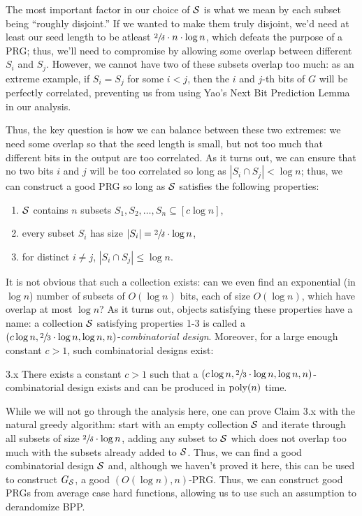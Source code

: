 \documentclass[11pt]{article}
\begin{document}
\noindent
The most important factor in our choice of $\mathcal{S}$ is what we mean by each subset being ``roughly disjoint.'' If we wanted to make them truly disjoint, we'd need at least our seed length to be atleast $\sfrac{2}{\delta} \cdot n \cdot \log n$, which defeats the purpose of a PRG; thus, we'll need to compromise by allowing some overlap between different $S_i$ and $S_j$. However, we cannot have two of these subsets overlap too much: as an extreme example, if $S_i = S_j$ for some $i < j$, then the $i$ and $j$-th bits of $G$ will be perfectly correlated, preventing us from using Yao's Next Bit Prediction Lemma in our analysis.

Thus, the key question is how we can balance between these two extremes: we need some overlap so that the seed length is small, but not too much that different bits in the output are too correlated. As it turns out, we can ensure that no two bits $i$ and $j$ will be too correlated so long as $|S_i \cap S_j| < \log n$; thus, we can construct a good PRG so long as $\mathcal{S}$ satisfies the following properties:
\begin{enumerate}
    \item $\mathcal{S}$ contains $n$ subsets $S_1, S_2, \ldots, S_n \subseteq [c \log n]$,
    \item every subset $S_i$ has size $|S_i| = \sfrac{2}{\delta} \cdot \log n$,
    \item for distinct $i \neq j$, $|S_i \cap S_j| \leq \log n$.
\end{enumerate}
It is not obvious that such a collection exists:  can we even find an exponential (in $\log n$) number of subsets of $O(\log n)$ bits, each of size $O(\log n)$, which have overlap at most $\log n$? As it turns out, objects satisfying these properties have a name: a collection $\mathcal{S}$ satisfying properties 1-3 is called a $(c \log n, \sfrac{2}{3} \cdot \log n, \log n, n)$-\emph{combinatorial design}. Moreover, for a large enough constant $c > 1$, such combinatorial designs exist:

\begin{claim}{3.x}
    There exists a constant $c > 1$ such that a $(c \log n, \sfrac{2}{3} \cdot \log n, \log n, n)$-combinatorial design exists and can be produced in $\mathrm{poly}(n)$ time.
\end{claim}

While we will not go through the analysis here, one can prove Claim 3.x with the natural greedy algorithm: start with an empty collection $\mathcal{S}$ and iterate through all subsets of size $\sfrac{2}{\delta} \cdot \log n$, adding any subset to $\mathcal{S}$ which does not overlap too much with the subsets already added to $\mathcal{S}$. Thus, we can find a good combinatorial design $\mathcal{S}$ and, although we haven't proved it here, this can be used to construct $G_{\mathcal{S}}$, a good $(O(\log n), n)$-PRG. Thus, we can construct good PRGs from average case hard functions, allowing us to use such an assumption to derandomize BPP.
\end{document}
